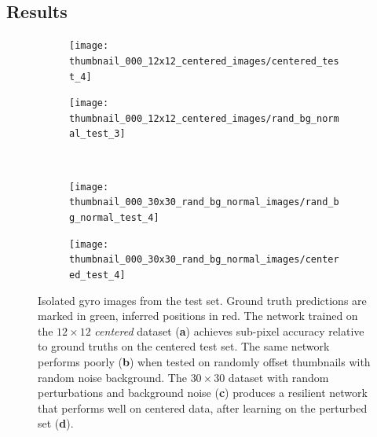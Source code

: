 \documentclass[twocolumn, 10pt]{asme2ej}
\begin{document}
\subsection{Results}
\label{sec:results}

\begin{figure}
  \centering
  \begin{subfigure}[b]{0.49\columnwidth}
    \texttt{[image: thumbnail\_000\_12x12\_centered\_images/centered\_test\_4]}
    \caption{}
    \label{fig:thumbnail_000_12x12_centered_images/centered_test_4}
  \end{subfigure}
  \hfill
  \begin{subfigure}[b]{0.49\columnwidth}
    \texttt{[image: thumbnail\_000\_12x12\_centered\_images/rand\_bg\_normal\_test\_3]}
    \caption{}
    \label{thumbnail_000_12x12_centered_images/rand_bg_normal_test_3}
  \end{subfigure}\\
  \begin{subfigure}[b]{0.49\columnwidth}
    \texttt{[image: thumbnail\_000\_30x30\_rand\_bg\_normal\_images/rand\_bg\_normal\_test\_4]}
    \caption{}
    \label{thumbnail_000_30x30_rand_bg_normal_images/rand_bg_normal_test_4}
  \end{subfigure}
  \hfill
  \begin{subfigure}[b]{0.49\columnwidth}
    \texttt{[image: thumbnail\_000\_30x30\_rand\_bg\_normal\_images/centered\_test\_4]}
    \caption{}
    \label{thumbnail_000_30x30_rand_bg_normal_images/centered_test_4}
  \end{subfigure}
  \caption{Isolated gyro images from the test set. Ground truth predictions are
    marked in green, inferred positions in red. The network trained on the
    $12\times 12$ \emph{centered} dataset (\textbf{a}) achieves sub-pixel
    accuracy relative to ground truths on the centered test set. The same
    network performs poorly (\textbf{b}) when tested on randomly offset
    thumbnails with random noise background. The $30\times 30$ dataset with
    random perturbations and background noise (\textbf{c}) produces a resilient
    network that performs well on centered data, after learning on the perturbed
    set (\textbf{d}).}
  \label{fig:thumbnails}
\end{figure}
\end{document}
